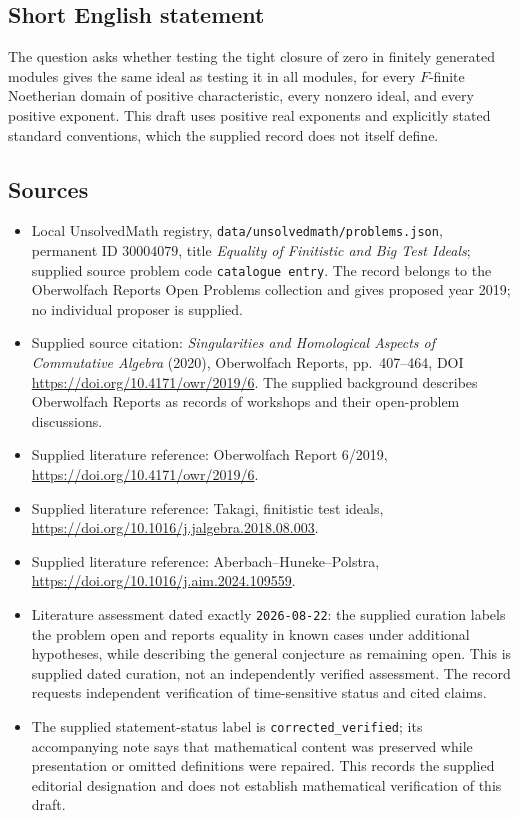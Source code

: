 \documentclass[11pt]{article}
\begin{document}
\subsection{Short English statement}
The question asks whether testing the tight closure of zero in finitely generated modules gives the same ideal as testing it in all modules, for every \(F\)-finite Noetherian domain of positive characteristic, every nonzero ideal, and every positive exponent. This draft uses positive real exponents and explicitly stated standard conventions, which the supplied record does not itself define.
\subsection{Sources}
\begin{itemize}
\item Local UnsolvedMath registry, \texttt{data/unsolvedmath/problems.json}, permanent ID \(30004079\), title \emph{Equality of Finitistic and Big Test Ideals}; supplied source problem code \texttt{catalogue entry}. The record belongs to the Oberwolfach Reports Open Problems collection and gives proposed year 2019; no individual proposer is supplied.
\item Supplied source citation: \emph{Singularities and Homological Aspects of Commutative Algebra} (2020), Oberwolfach Reports, pp.~407--464, DOI \url{https://doi.org/10.4171/owr/2019/6}. The supplied background describes Oberwolfach Reports as records of workshops and their open-problem discussions.
\item Supplied literature reference: Oberwolfach Report 6/2019, \url{https://doi.org/10.4171/owr/2019/6}.
\item Supplied literature reference: Takagi, finitistic test ideals, \url{https://doi.org/10.1016/j.jalgebra.2018.08.003}.
\item Supplied literature reference: Aberbach--Huneke--Polstra, \url{https://doi.org/10.1016/j.aim.2024.109559}.
\item Literature assessment dated exactly \texttt{2026-08-22}: the supplied curation labels the problem open and reports equality in known cases under additional hypotheses, while describing the general conjecture as remaining open. This is supplied dated curation, not an independently verified assessment. The record requests independent verification of time-sensitive status and cited claims.
\item The supplied statement-status label is \texttt{corrected\_verified}; its accompanying note says that mathematical content was preserved while presentation or omitted definitions were repaired. This records the supplied editorial designation and does not establish mathematical verification of this draft.
\end{itemize}
\end{document}
